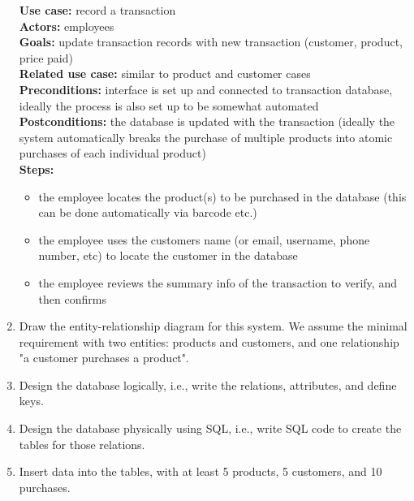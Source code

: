 \documentclass[notitlepage]{report}
\begin{document}
\begin{enumerate}[itemindent=-1.5em]
	\textbf{Use case:} record a transaction\\
	\textbf{Actors:} employees\\
	\textbf{Goals:} update transaction records with new transaction (customer, product, price paid)\\
	\textbf{Related use case:} similar to product and customer cases\\
	\textbf{Preconditions:} interface is set up and connected to transaction database, ideally the process is also set up to be somewhat automated\\
	\textbf{Postconditions:} the database is updated with the transaction (ideally the system automatically breaks the purchase of multiple products into atomic purchases of each individual product)\\
	\textbf{Steps:} 
		\begin{itemize}
		\item the employee locates the product(s) to be purchased in the database (this can be done automatically via barcode etc.)
		\item the employee uses the customers name (or email, username, phone number, etc) to locate the customer in the database
		\item the employee reviews the summary info of the transaction to verify, and then confirms
		\end{itemize}
	
	\item Draw the entity-relationship diagram for this system. We assume the minimal requirement with two entities: products and customers, and one relationship "a customer purchases a product".
	\item Design the database logically, i.e., write the relations, attributes, and define keys.
	\item Design the database physically using SQL, i.e., write SQL code to create the tables for those relations.
	\item Insert data into the tables, with at least 5 products, 5 customers, and 10 purchases.
\end{enumerate}
\end{document}
